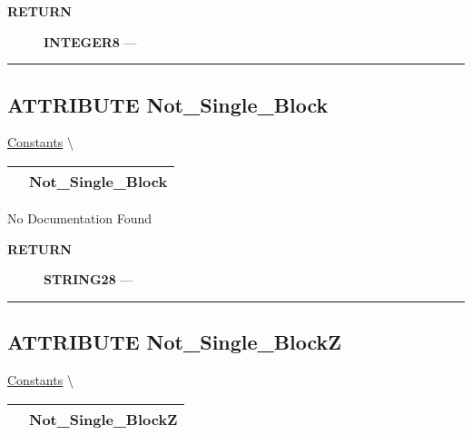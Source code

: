 \par
\begin{description}
\item [\colorbox{tagtype}{\color{white} \textbf{\textsf{RETURN}}}] \textbf{INTEGER8} --- 
\end{description}




\rule{\linewidth}{0.5pt}
\subsection*{\textsf{\colorbox{headtoc}{\color{white} ATTRIBUTE}
Not\_Single\_Block}}

\hypertarget{ecldoc:pbblas.constants.not_single_block}{}
\hspace{0pt} \hyperlink{ecldoc:PBblas.Constants}{Constants} \textbackslash 

{\renewcommand{\arraystretch}{1.5}
\begin{tabularx}{\textwidth}{|>{\raggedright\arraybackslash}l|X|}
\hline
\hspace{0pt}\mytexttt{\color{red} } & \textbf{Not\_Single\_Block} \\
\hline
\end{tabularx}
}

\par





No Documentation Found








\par
\begin{description}
\item [\colorbox{tagtype}{\color{white} \textbf{\textsf{RETURN}}}] \textbf{STRING28} --- 
\end{description}




\rule{\linewidth}{0.5pt}
\subsection*{\textsf{\colorbox{headtoc}{\color{white} ATTRIBUTE}
Not\_Single\_BlockZ}}

\hypertarget{ecldoc:pbblas.constants.not_single_blockz}{}
\hspace{0pt} \hyperlink{ecldoc:PBblas.Constants}{Constants} \textbackslash 

{\renewcommand{\arraystretch}{1.5}
\begin{tabularx}{\textwidth}{|>{\raggedright\arraybackslash}l|X|}
\hline
\hspace{0pt}\mytexttt{\color{red} } & \textbf{Not\_Single\_BlockZ} \\
\hline
\end{tabularx}
}

